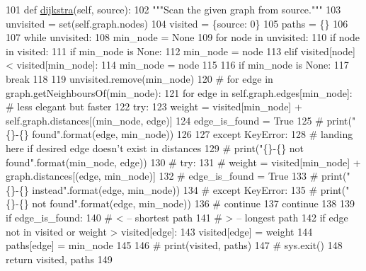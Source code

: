 \begin{DoxyCode}
101     \textcolor{keyword}{def }\hyperlink{classdijkstra_1_1Dijsktra_a851d3a005118bd06bbf7bebc15e2888f}{dijkstra}(self, source):
102         \textcolor{stringliteral}{"""Scan the given graph from source."""}
103         unvisited = set(self.graph.nodes)
104         visited = \{source: 0\}
105         paths = \{\}
106 
107         \textcolor{keywordflow}{while} unvisited:
108             min\_node = \textcolor{keywordtype}{None}
109             \textcolor{keywordflow}{for} node \textcolor{keywordflow}{in} unvisited:
110                 \textcolor{keywordflow}{if} node \textcolor{keywordflow}{in} visited:
111                     \textcolor{keywordflow}{if} min\_node \textcolor{keywordflow}{is} \textcolor{keywordtype}{None}:
112                         min\_node = node
113                     \textcolor{keywordflow}{elif} visited[node] < visited[min\_node]:
114                         min\_node = node
115 
116             \textcolor{keywordflow}{if} min\_node \textcolor{keywordflow}{is} \textcolor{keywordtype}{None}:
117                 \textcolor{keywordflow}{break}
118 
119             unvisited.remove(min\_node)
120             \textcolor{comment}{# for edge in graph.getNeighboursOf(min\_node):}
121             \textcolor{keywordflow}{for} edge \textcolor{keywordflow}{in} self.graph.edges[min\_node]:  \textcolor{comment}{# less elegant but faster}
122                 \textcolor{keywordflow}{try}:
123                     weight = visited[min\_node] + self.graph.distances[(min\_node, edge)]
124                     edge\_is\_found = \textcolor{keyword}{True}
125                     \textcolor{comment}{# print("\{\}-\{\} found".format(edge, min\_node))}
126 
127                 \textcolor{keywordflow}{except} KeyError:
128                     \textcolor{comment}{# landing here if desired edge doesn't exist in distances}
129                     \textcolor{comment}{# print("\{\}-\{\} not found".format(min\_node, edge))}
130                     \textcolor{comment}{# try:}
131                     \textcolor{comment}{#     weight = visited[min\_node] + graph.distances[(edge, min\_node)]}
132                     \textcolor{comment}{#     edge\_is\_found = True}
133                     \textcolor{comment}{#     print("\{\}-\{\} instead".format(edge, min\_node))}
134                     \textcolor{comment}{# except KeyError:}
135                     \textcolor{comment}{#     print("\{\}-\{\} not found".format(edge, min\_node))}
136                     \textcolor{comment}{#     continue}
137                     \textcolor{keywordflow}{continue}
138 
139                 \textcolor{keywordflow}{if} edge\_is\_found:
140                     \textcolor{comment}{# < -- shortest path}
141                     \textcolor{comment}{# > -- longest path}
142                     \textcolor{keywordflow}{if} edge \textcolor{keywordflow}{not} \textcolor{keywordflow}{in} visited \textcolor{keywordflow}{or} weight > visited[edge]:
143                         visited[edge] = weight
144                         paths[edge] = min\_node
145 
146         \textcolor{comment}{# print(visited, paths)}
147         \textcolor{comment}{# sys.exit()}
148         \textcolor{keywordflow}{return} visited, paths
149 
\end{DoxyCode}
